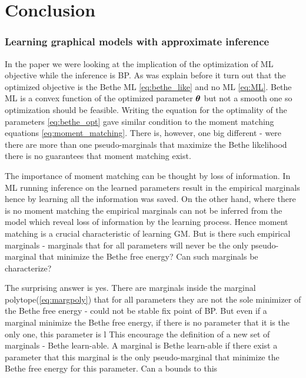 \chapter{Conclusion} %
\label{con} %
\subsection{Learning graphical models with approximate inference}
In the paper \cite{heinemann2012cannot} we were looking at the implication of the optimization of ML objective while the inference is BP.
As was explain before  it turn out that the optimized objective is the Bethe ML \eqref{eq:bethe_like} and no ML \eqref{eq:ML}.
Bethe ML is a convex function of the optimized parameter $\boldsymbol{\theta}$ but not a smooth one so optimization should be feasible.
Writing the equation for the optimality of the parameters \eqref{eq:bethe_opt} gave similar condition to the moment matching equations \eqref{eq:moment_matching}.
There is, however, one big different - were there are more than one pseudo-marginals that maximize the Bethe likelihood there is no guarantees that moment matching exist.

The importance of moment matching can be thought by loss of information.
In ML running inference on the learned parameters result in the empirical marginals hence by learning all the information was saved.
On the other hand, where there is no moment matching the empirical marginals can not be inferred from the model which reveal loss of information by the learning process.
Hence moment matching is a crucial characteristic of learning GM.
But is there such empirical marginals - marginals that for all parameters will never be the only pseudo-marginal that minimize the Bethe free energy?
Can such marginals be characterize?

The surprising answer is yes.
There are marginals inside the marginal polytope(\eqref{eq:margpoly}) that for all parameters they are not the sole minimizer of the Bethe free energy - could not be stable fix point of BP.
But even if a marginal minimize the Bethe free energy, if there is no parameter that it is the only one, this parameter is l
This encourage the definition of a new set of marginals - Bethe learn-able.
A marginal is Bethe learn-able if there exist a parameter that this marginal is the only pseudo-marginal that minimize the Bethe free energy for this parameter.
Can a bounds to this 


